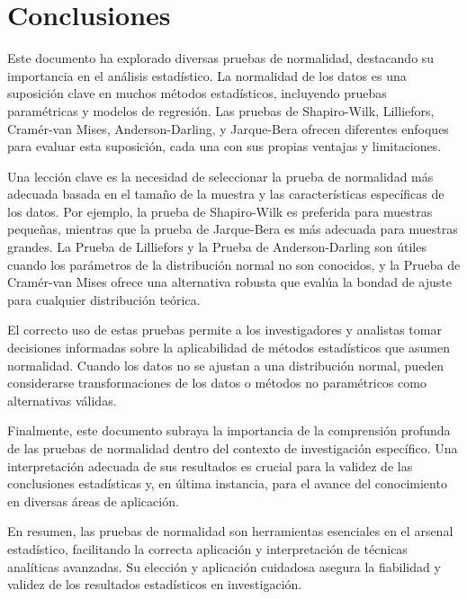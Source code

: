 \documentclass{article}
\begin{document}
\section{Conclusiones}

Este documento ha explorado diversas pruebas de normalidad, destacando su importancia en el análisis estadístico. La normalidad de los datos es una suposición clave en muchos métodos estadísticos, incluyendo pruebas paramétricas y modelos de regresión. Las pruebas de Shapiro-Wilk, Lilliefors, Cramér-van Mises, Anderson-Darling, y Jarque-Bera ofrecen diferentes enfoques para evaluar esta suposición, cada una con sus propias ventajas y limitaciones.

Una lección clave es la necesidad de seleccionar la prueba de normalidad más adecuada basada en el tamaño de la muestra y las características específicas de los datos. Por ejemplo, la prueba de Shapiro-Wilk es preferida para muestras pequeñas, mientras que la prueba de Jarque-Bera es más adecuada para muestras grandes. La Prueba de Lilliefors y la Prueba de Anderson-Darling son útiles cuando los parámetros de la distribución normal no son conocidos, y la Prueba de Cramér-van Mises ofrece una alternativa robusta que evalúa la bondad de ajuste para cualquier distribución teórica.

El correcto uso de estas pruebas permite a los investigadores y analistas tomar decisiones informadas sobre la aplicabilidad de métodos estadísticos que asumen normalidad. Cuando los datos no se ajustan a una distribución normal, pueden considerarse transformaciones de los datos o métodos no paramétricos como alternativas válidas.

Finalmente, este documento subraya la importancia de la comprensión profunda de las pruebas de normalidad dentro del contexto de investigación específico. Una interpretación adecuada de sus resultados es crucial para la validez de las conclusiones estadísticas y, en última instancia, para el avance del conocimiento en diversas áreas de aplicación.

En resumen, las pruebas de normalidad son herramientas esenciales en el arsenal estadístico, facilitando la correcta aplicación y interpretación de técnicas analíticas avanzadas. Su elección y aplicación cuidadosa asegura la fiabilidad y validez de los resultados estadísticos en investigación.
\end{document}
